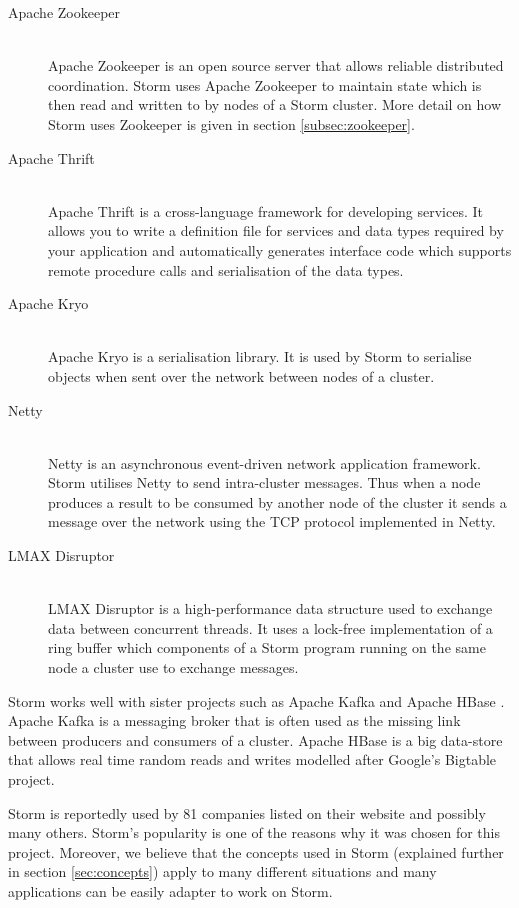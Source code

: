 \begin{description}
	\item[Apache Zookeeper] \hfill \\
	Apache Zookeeper \cite{ApacheZookeeper} is an open source server that allows reliable distributed coordination. Storm uses Apache Zookeeper to maintain state which is then read and written to by nodes of a Storm cluster. More detail on how Storm uses Zookeeper is given in section \ref{subsec:zookeeper}.
	\item[Apache Thrift] \hfill \\
	Apache Thrift \cite{ApacheThrift} is a cross-language framework for developing services. It allows you to write a definition file for services and data types required by your application and automatically generates interface code which supports remote procedure calls and serialisation of the data types.
	\item[Apache Kryo] \hfill \\
	Apache Kryo \cite{ApacheKryo} is a serialisation library. It is used by Storm to serialise objects when sent over the network between nodes of a cluster.
	\item[Netty] \hfill \\
	Netty \cite{Netty} is an asynchronous event-driven network application framework. Storm utilises Netty to send intra-cluster messages. Thus when a node produces a result to be consumed by another node of the cluster it sends a message over the network using the TCP protocol implemented in Netty.
	\item[LMAX Disruptor] \hfill \\
	LMAX Disruptor \cite{LMAXDisruptor} is a high-performance data structure used to exchange data between concurrent threads. It uses a lock-free implementation of a ring buffer which components of a Storm program running on the same node a cluster use to exchange messages.
\end{description}

Storm works well with sister projects such as Apache Kafka \cite{ApacheKafka} and Apache HBase \cite{ApacheHBase}. Apache Kafka is a messaging broker that is often used as the missing link between producers and consumers of a cluster. Apache HBase is a big data-store that allows real time random reads and writes modelled after Google's Bigtable project. \cite{Bigtable}

Storm is reportedly used by 81 companies listed on their website \cite{https://storm.apache.org/documentation/Powered-By.html} and possibly many others. Storm's popularity is one of the reasons why it was chosen for this project. Moreover, we believe that the concepts used in Storm (explained further in section \ref{sec:concepts}) apply to many different situations and many applications can be easily adapter to work on Storm.

